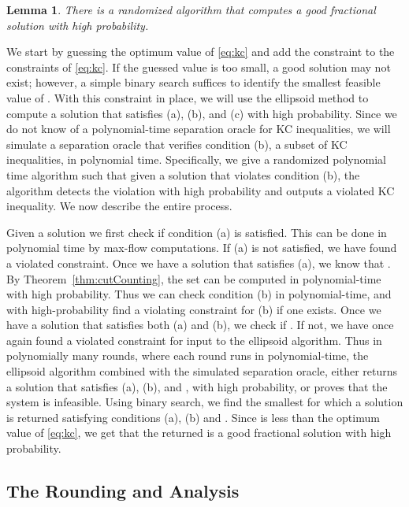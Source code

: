 \documentclass[11pt]{article}
\newcounter{thm0Rcopies}
\newcounter{thm_saved}
\newtheorem{lemma}{Lemma}[section]
\def\KCLP{\eqref{eq:kc}\xspace}
\renewenvironment{proof}{\vspace{-0.1in}\noindent{\bf Proof:}}{\hspace*{\fill}\par}
\begin{document}
\begin{lemma}\label{lem:ell}
There is a randomized algorithm that computes a good fractional solution with high probability.
\end{lemma}
\begin{proof}
  We start by guessing the optimum value  of \KCLP and add the
  constraint  to the constraints of
  \KCLP. If the guessed value is too small, a good solution may not
  exist; however, a simple binary search suffices to identify the
  smallest feasible value of .  With this constraint in place, we
  will use the ellipsoid method to compute a solution that satisfies
  (a), (b), and (c) with high probability.  Since we do not know of a
  polynomial-time separation oracle for KC inequalities, we will
  simulate a separation oracle that verifies condition (b), a subset
  of KC inequalities, in polynomial time. Specifically, we give a
  randomized polynomial time algorithm such that given a solution 
  that violates condition (b), the algorithm detects the violation
  with high probability and outputs a violated KC inequality. We now
  describe the entire process.

  Given a solution  we first check if condition (a) is
  satisfied. This can be done in polynomial time by  max-flow
  computations. If (a) is not satisfied, we have found a violated
  constraint. Once we have a solution that satisfies (a), we know that
  . By Theorem~\ref{thm:cutCounting}, the set  can
  be computed in polynomial-time with high probability.  Thus we can
  check condition (b) in polynomial-time, and with high-probability
  find a violating constraint for (b) if one exists. Once we have a
  solution that satisfies both (a) and (b), we check if . If not, we have once again found a violated
  constraint for input to the ellipsoid algorithm.  Thus in
  polynomially many rounds, where each round runs in polynomial-time,
  the ellipsoid algorithm combined with the simulated separation
  oracle, either returns a solution  that satisfies (a), (b), and
  , with high probability, or proves that
  the system is infeasible. Using binary search, we find the smallest
   for which a solution  is returned satisfying conditions (a),
  (b) and . Since  is less than the
  optimum value of \KCLP, we get that the returned  is a good
  fractional solution with high probability.
\end{proof}






\subsection{The Rounding and Analysis}
\end{document}
